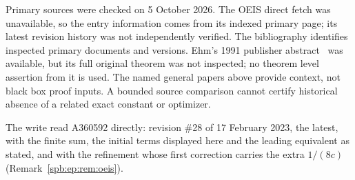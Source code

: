 Primary sources were checked on 5 October 2026. The OEIS direct fetch was unavailable, so the entry information comes from its indexed primary page; its latest revision history was not independently verified. The bibliography identifies inspected primary documents and versions. Ehm's 1991 publisher abstract~\cite{ehm} was available, but its full original theorem was not inspected; no theorem level assertion from it is used. The named general papers above provide context, not black box proof inputs. A bounded source comparison cannot certify historical absence of a related exact constant or optimizer.
\begin{writenote}[7 October 2026]
The write read A360592 directly: revision \#28 of 17 February 2023, the
latest, with the finite sum, the initial terms displayed here and the leading
equivalent as stated, and with the refinement whose first correction carries
the extra $1/(8c)$ (Remark~\ref{spb:ep:rem:oeis}).
\end{writenote}

